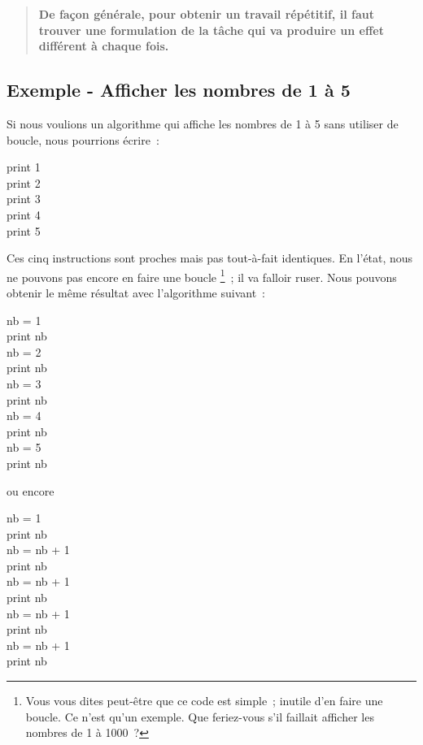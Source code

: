 	\begin{quote}
		\bfseries
		De façon générale,
		pour obtenir un travail répétitif,
		il faut trouver une formulation de la tâche
		qui va produire un effet différent à chaque fois.
	\end{quote}
	
	\subsection{Exemple - Afficher les nombres de 1 à 5}
	
		Si nous voulions un algorithme qui affiche les nombres de 1 à 5
		sans utiliser de boucle, nous pourrions écrire~:

		\begin{langagenaturel}
			print 1\\
			print 2\\
			print 3\\
			print 4\\
			print 5
		\end{langagenaturel}
		
		Ces cinq instructions sont proches mais pas tout-à-fait identiques. 
		En l’état, nous ne pouvons pas encore en faire une boucle%
		\footnote{%
			Vous vous dites peut-être que ce code est simple~;
			inutile d’en faire une boucle.
			Ce n’est qu’un exemple.
			Que feriez-vous s’il faillait afficher les nombres
			de 1 à 1000~?
		}~;
		il va falloir ruser.
		Nous pouvons obtenir le même résultat avec l’algorithme suivant~:

		\begin{minipage}{5cm}
			\begin{langagenaturel}
				nb = 1\\
				print nb\\
				nb = 2\\
				print nb\\
				nb = 3\\
				print nb\\
				nb = 4\\
				print nb\\
				nb = 5\\
				print nb\\
			\end{langagenaturel}
		\end{minipage}
		\quad ou encore \quad
		\begin{minipage}{5cm}
			\begin{langagenaturel}
				nb = 1\\
				print nb\\
				nb = nb + 1\\
				print nb\\
				nb = nb + 1\\
				print nb\\
				nb = nb + 1\\
				print nb\\
				nb = nb + 1\\
				print nb\\
			\end{langagenaturel}
		\end{minipage}
		

